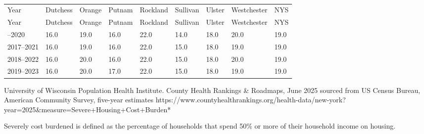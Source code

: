 \documentclass[
  english,
  letterpaper,
]{report}
\begin{document}
\begin{longtable}[]{@{}lllllllll@{}}

\caption{\label{tbl-severely-cost-burdened}Percentage of Severely Cost
Burdened Households, 2016--2023}

\tabularnewline

\caption{}\label{T_db47c}\tabularnewline
\toprule\noalign{}
Year & Dutchess & Orange & Putnam & Rockland & Sullivan & Ulster &
Westchester & NYS \\
\midrule\noalign{}
\endfirsthead
\toprule\noalign{}
Year & Dutchess & Orange & Putnam & Rockland & Sullivan & Ulster &
Westchester & NYS \\
\midrule\noalign{}
\endhead
\bottomrule\noalign{}
\endlastfoot
2016--2020 & 16.0 & 19.0 & 16.0 & 22.0 & 14.0 & 18.0 & 20.0 & 19.0 \\
2017--2021 & 16.0 & 19.0 & 16.0 & 22.0 & 15.0 & 18.0 & 19.0 & 19.0 \\
2018--2022 & 16.0 & 20.0 & 16.0 & 22.0 & 15.0 & 18.0 & 20.0 & 19.0 \\
2019--2023 & 16.0 & 20.0 & 17.0 & 22.0 & 15.0 & 18.0 & 19.0 & 19.0 \\

\end{longtable}

\begin{tcolorbox}[enhanced jigsaw, breakable, leftrule=.75mm, title=\textcolor{quarto-callout-note-color}{\faInfo}\hspace{0.5em}{Source}, bottomrule=.15mm, opacityback=0, left=2mm, colback=white, bottomtitle=1mm, coltitle=black, colbacktitle=quarto-callout-note-color!10!white, colframe=quarto-callout-note-color-frame, opacitybacktitle=0.6, toptitle=1mm, titlerule=0mm, arc=.35mm, rightrule=.15mm, toprule=.15mm]

University of Wisconsin Population Health Institute. County Health
Rankings \& Roadmaps, June 2025 sourced from US Census Bureau, American
Community Survey, five-year estimates
https://www.countyhealthrankings.org/health-data/new-york?year=2025\&measure=Severe+Housing+Cost+Burden*

\end{tcolorbox}

\begin{tcolorbox}[enhanced jigsaw, breakable, leftrule=.75mm, title=\textcolor{quarto-callout-note-color}{\faInfo}\hspace{0.5em}{Note}, bottomrule=.15mm, opacityback=0, left=2mm, colback=white, bottomtitle=1mm, coltitle=black, colbacktitle=quarto-callout-note-color!10!white, colframe=quarto-callout-note-color-frame, opacitybacktitle=0.6, toptitle=1mm, titlerule=0mm, arc=.35mm, rightrule=.15mm, toprule=.15mm]

Severely cost burdened is defined as the percentage of households that
spend 50\% or more of their household income on housing.

\end{tcolorbox}
\end{document}
